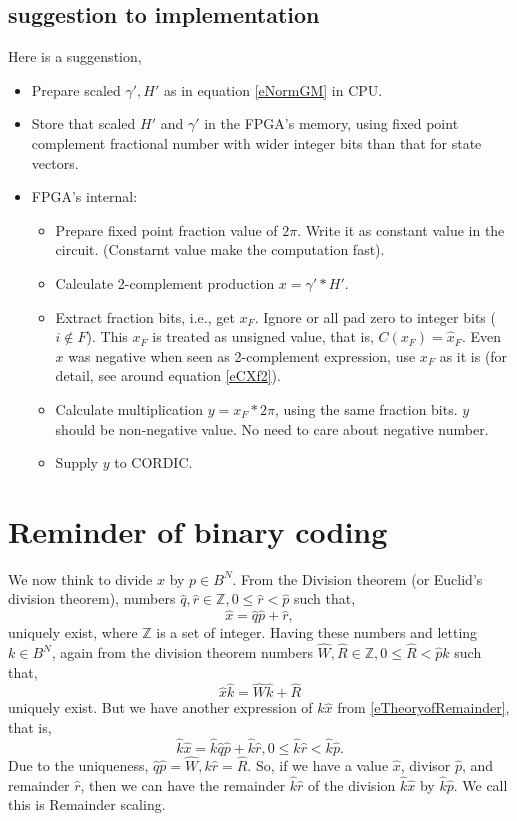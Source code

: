 \documentclass[a4paper]{article}
\newcommand{\eqlabel}[1]{\label{#1}\tag{#1}}
\newcommand{\sZ}{\mathbb{Z}}
\newcommand{\hx}{{\hat{x}}}
\newcommand{\hp}{{\hat{p}}}
\newcommand{\hr}{{\hat{r}}}
\newcommand{\hq}{{\hat{q}}}
\newcommand{\hk}{{\hat{k}}}
\begin{document}
\subsection{suggestion to implementation}
Here is a suggenstion, 
\begin{itemize}
    \item Prepare scaled \(\gamma', H'\) as in equation \eqref{eNormGM} in CPU.
    \item Store that scaled \(H'\) and \(\gamma'\) in the FPGA's memory, using fixed point complement fractional number with wider integer bits than that for state vectors.
    \item FPGA's internal:
    \begin{itemize}
        \item Prepare fixed point fraction value of \(2\pi\). Write it as constant value in the circuit. (Constarnt value make the computation fast).
        \item Calculate 2-complement production \(x = \gamma'* H'\).
        \item Extract fraction bits, i.e., get \(x_F\). Ignore or all pad zero to integer bits (\(i\not\in F\)). This \(x_F\) is treated as unsigned value, that is, \(C(x_F) = \hx_F\). Even \(x\) was negative when seen as 2-complement expression, use \(x_F\) as it is (for detail, see around equation \eqref{eCXf2}).
        \item Calculate multiplication \(y = x_F * 2\pi\), using the same fraction bits. \(y\) should be non-negative value. No need to care about negative number.
        \item Supply \(y\) to CORDIC.
    \end{itemize}
\end{itemize}
\section{Reminder of binary coding}
\label{sMain}
We now think to divide \(x\) by \(p\in B^N\). From the Division theorem (or Euclid's division theorem), numbers \(\hq, \hr\in \sZ, 0 \leq \hr < \hp\) such that,
\begin{equation}
    \eqlabel{eTheoryofRemainder}
    \hx = \hq \hp + \hr,
\end{equation}
uniquely exist, where \(\sZ\) is a set of integer. Having these numbers and letting \(k\in B^N\), again from the division theorem numbers \(\hat{W}, \hat{R}\in \sZ, 0 \leq \hat{R} < \hp k\) such that,
\begin{equation}
    \eqlabel{eMultiDiv}
\hx \hk= \hat{W} \hk + \hat{R}
\end{equation}
uniquely exist. But we have another expression of \(k\hx \) from \eqref{eTheoryofRemainder}, that is, 
\[
    \hk \hx = \hk\hq \hp + \hk\hr, 0\leq \hk \hr < \hk\hp.
\]
Due to the uniqueness, \(\hq \hp = \hat{W}, k\hr = \hat{R}\). So, if we have a value \(\hx\), divisor \(\hp\), and remainder \(\hr\), then we can have the remainder \(\hk \hr \) of the division  \(\hk \hx\) by \(\hk\hp\). We call this is Remainder scaling.
\end{document}
